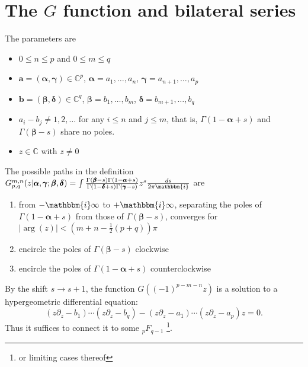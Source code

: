 \documentclass[12pt]{article}
\newcommand{\ii}[0] {\mathbbm{i}}
\numberwithin{equation}{section}
\newcommand{\bfa}[0] {\mathbf{a}}
\newcommand{\bfb}[0] {\mathbf{b}}
\newcommand{\bfalpha}[0] {\pmb{\alpha}}
\newcommand{\bfgamma}[0] {\pmb{\gamma}}
\newcommand{\bfbeta}[0]  {\pmb{\beta}}
\newcommand{\bfdelta}[0] {\pmb{\delta}}
\begin{document}
\section{The $G$ function and bilateral series}
The parameters are
\begin{itemize}
\item{$0 \le n \le p$ and $0 \le m \le q$}
\item{$\bfa = (\bfalpha, \bfgamma) \in \mathbb{C}^{p}$, $\bfalpha = a_1, \dots, a_n$, $\bfgamma = a_{n+1}, \dots, a_p$}
\item{$\bfb = (\bfbeta, \bfdelta) \in \mathbb{C}^{q}$, $\bfbeta = b_1, \dots, b_m$, $\bfdelta = b_{m+1}, \dots, b_q$}
\item{$a_i-b_j \neq 1, 2, \dots$ for any $i \le n$ and $j \le m$, that is, $\Gamma(1-\bfalpha+s)$ and $\Gamma(\bfbeta-s)$ share no poles.}
\item{$z \in \mathbb{C}$ with $z \neq 0$}
\end{itemize}
The possible paths in the definition $ G_{p,q}^{m,n} (z |\bfalpha, \bfgamma; \bfbeta, \bfdelta) = \int \frac{\Gamma(\bfbeta-s)\Gamma(1-\bfalpha+s)}{\Gamma(1-\bfdelta+s)\Gamma(\bfgamma-s)}z^s\frac{ds}{2 \pi \ii}$ are
\begin{enumerate}
\item{from $-\ii \infty$ to $+ \ii \infty$, separating the poles of $\Gamma(1-\bfalpha+s)$ from those of $\Gamma(\bfbeta-s)$, converges for $|\arg(z)| < (m+n-\tfrac{1}{2}(p+q)) \pi$}
\item{encircle the poles of $\Gamma(\bfbeta-s)$ clockwise}
\item{encircle the poles of $\Gamma(1-\bfalpha+s)$ counterclockwise}
\end{enumerate}
By the shift $s \to s+1$, the function $G((-1)^{p-m-n}z)$ is a solution to a hypergeometric differential equation:
\begin{equation*}
(z \partial_z - b_1)\cdots (z \partial_z - b_q)-(z \partial_z - a_1) \cdots (z \partial_z - a_p) z = 0\text{.}
\end{equation*}
Thus it suffices to connect it to some ${}_p F_{q-1}$ \footnote{or limiting cases thereof}.
\end{document}
